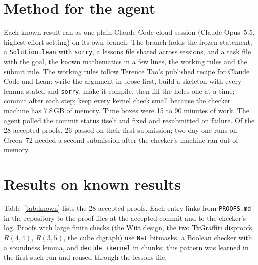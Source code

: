 \documentclass[11pt]{article}
\begin{document}
\section{Method for the agent}

Each known result ran as one plain Claude Code cloud session (Claude Opus~5.5, highest effort setting) on its own branch.
The branch holds the frozen statement, a \texttt{Solution.lean} with \texttt{sorry}, a lessons file shared across sessions, and a task file with the goal, the known mathematics in a few lines, the working rules and the submit rule.
The working rules follow Terence Tao's published recipe for Claude Code and Lean: write the argument in prose first, build a skeleton with every lemma stated and \texttt{sorry}, make it compile, then fill the holes one at a time; commit after each step; keep every kernel check small because the checker machine has 7.8\,GB of memory.
Time boxes were 15 to 90 minutes of work.
The agent polled the commit status itself and fixed and resubmitted on failure. Of the 28 accepted proofs, 26 passed on their first submission; two day-one runs on Green~72 needed a second submission after the checker's machine ran out of memory.

\section{Results on known results}

Table~\ref{tab:known} lists the 28 accepted proofs.
Each entry links from \texttt{PROOFS.md} in the repository to the proof files at the accepted commit and to the checker's log.
Proofs with large finite checks (the Witt design, the two TxGraffiti disproofs, $R(4,4)$, $R(3,5)$, the cube digraph) use \texttt{Nat} bitmasks, a Boolean checker with a soundness lemma, and \texttt{decide +kernel} in chunks; this pattern was learned in the first such run and reused through the lessons file.
\end{document}
